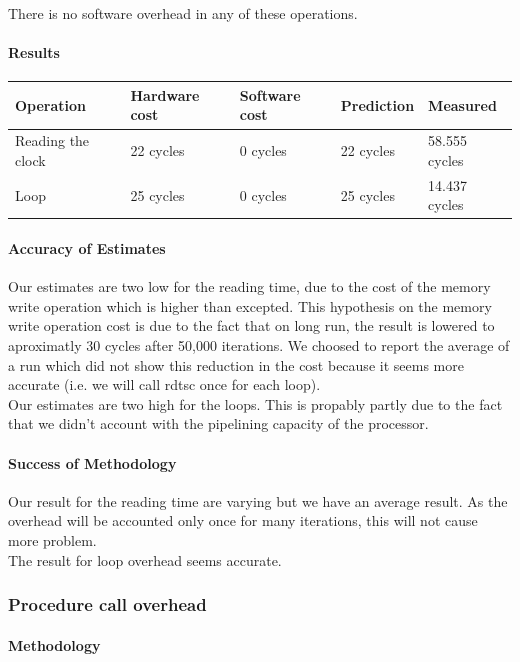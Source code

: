 There is no software overhead in any of these operations.

\paragraph{Results}

\begin{tabular}{| l | l | l | l | l |}
\hline
Operation & Hardware cost & Software cost & Prediction & Measured \\
\hline
Reading the clock & 22 cycles & 0 cycles & 22 cycles & 58.555 cycles \\
\hline
Loop & 25 cycles & 0 cycles & 25 cycles & 14.437 cycles \\
\hline
\end{tabular}
\paragraph{Accuracy of Estimates}
Our estimates are two low for the reading time, due to the cost of the memory write operation which is
higher than excepted.
This hypothesis on the memory write operation cost is due to the fact that on long run,
the result is lowered to aproximatly 30 cycles after 50,000 iterations.
We choosed to report the average of a run which did not show this reduction in
the cost because it seems more accurate (i.e. we will call rdtsc once for each
loop).\\

Our estimates are two high for the loops.
This is propably partly due to the fact that we didn't account with the pipelining
capacity of the processor.

\paragraph{Success of Methodology}
Our result for the reading time are varying but we have an average result. As
the overhead will be accounted only once for many iterations, this will not
cause more problem.\\

The result for loop overhead seems accurate.

\subsubsection{Procedure call overhead}
\paragraph{Methodology}
